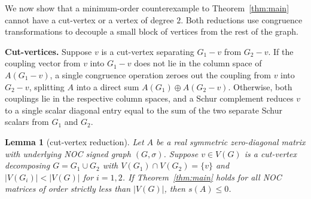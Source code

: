\documentclass[10pt,letterpaper]{article}
\theoremstyle{zetaplain}
\newtheorem{lemma}[theorem]{Lemma}
\theoremstyle{zetadef}
\theoremstyle{remark}
\numberwithin{equation}{section}
\begin{document}
We now show that a minimum-order counterexample to Theorem~\ref{thm:main} cannot have a cut-vertex or a vertex of degree $2$. Both reductions use congruence transformations to decouple a small block of vertices from the rest of the graph.

\medskip
\noindent\textbf{Cut-vertices.}
Suppose $v$ is a cut-vertex separating $G_1 - v$ from $G_2 - v$. If the coupling vector from $v$ into $G_1 - v$ does not lie in the column space of $A(G_1 - v)$, a single congruence operation zeroes out the coupling from $v$ into $G_2 - v$, splitting $A$ into a direct sum $A(G_1) \oplus A(G_2 - v)$. Otherwise, both couplings lie in the respective column spaces, and a Schur complement reduces $v$ to a single scalar diagonal entry equal to the sum of the two separate Schur scalars from $G_1$ and $G_2$.

\begin{lemma}[cut-vertex reduction]\label{lem:cutvertex}
Let $A$ be a real symmetric zero-diagonal matrix with underlying NOC signed graph $(G, \sigma)$. Suppose $v \in V(G)$ is a cut-vertex decomposing $G = G_1 \cup G_2$ with $V(G_1) \cap V(G_2) = \{v\}$ and $|V(G_i)| < |V(G)|$ for $i = 1, 2$. If Theorem~\ref{thm:main} holds for all NOC matrices of order strictly less than $|V(G)|$, then $s(A) \le 0$.
\end{lemma}
\end{document}
